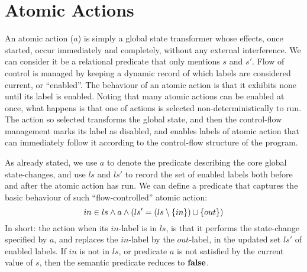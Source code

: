 \section{Atomic Actions}\label{sec:atomic}

An atomic action ($a$) is simply a global state transformer whose effects,
once started,
occur immediately and completely, without any external interference.
We can consider it be a relational predicate that only mentions $s$ and $s'$.
Flow of control is managed by keeping a dynamic record
of which labels are considered current, or ``enabled''.
The behaviour of an atomic action is that it exhibits none
until its label is enabled.
Noting that many atomic actions can be enabled at once,
what happens is that one of actions is selected non-deterministically to run.
The action so selected transforms the global state,
and then the control-flow management marks its label as disabled,
and enables labels of atomic action that can immediately follow it
according to the control-flow structure of the program.
%

As already stated,
we use $a$ to denote the predicate describing the core global state-changes,
and  use $ls$ and $ls'$ to record the set of enabled labels both before
and after the atomic action has run.
We can define a predicate that captures the basic behaviour
of such ``flow-controlled'' atomic action:
\begin{equation}
  in \in ls
  \land
  a
  \land
  (ls'=(ls\setminus\{{in}\})\cup\{{out}\})
  \label{pred:flow-atomic-action}
\end{equation}
In short: the action when its $in$-label is in $ls$,
is that it performs the state-change specified by $a$,
and replaces the $in$-label by the $out$-label,
in the updated set $ls'$ of enabled labels.
If $in$ is not in $ls$,
or predicate $a$ is not satisfied by the current value of $s$,
then the semantic predicate reduces to $\mathbf{false}$.


